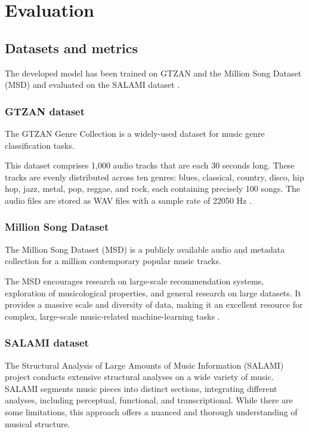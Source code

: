 \chapter{Evaluation}

\section{Datasets and metrics}
\label{section:Datasets and metrics}

The developed model has been trained on GTZAN \cite{GTZAN} and the Million Song Dataset (MSD) \cite{MSD} and evaluated on the SALAMI dataset \cite{Smith2011DESIGNANNOTATIONS}. 

\subsection{GTZAN dataset}
The GTZAN Genre Collection is a widely-used dataset for music genre classification tasks.

This dataset comprises 1,000 audio tracks that are each 30 seconds long. These tracks are evenly distributed across ten genres: blues, classical, country, disco, hip hop, jazz, metal, pop, reggae, and rock, each containing precisely 100 songs. The audio files are stored as WAV files with a sample rate of 22050 Hz \cite{GTZAN}.

\subsection{Million Song Dataset}
The Million Song Dataset (MSD) is a publicly available audio and metadata collection for a million contemporary popular music tracks.

The MSD encourages research on large-scale recommendation systems, exploration of musicological properties, and general research on large datasets. It provides a massive scale and diversity of data, making it an excellent resource for complex, large-scale music-related machine-learning tasks \cite{MSD}.

\subsection{SALAMI dataset}

The Structural Analysis of Large Amounts of Music Information (SALAMI) project conducts extensive structural analyses on a wide variety of music. SALAMI segments music pieces into distinct sections, integrating different analyses, including perceptual, functional, and transcriptional. While there are some limitations, this approach offers a nuanced and thorough understanding of musical structure.

